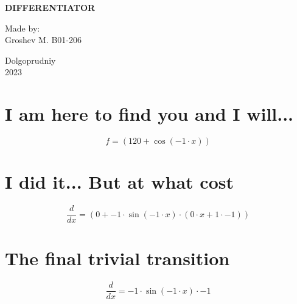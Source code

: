 \documentclass[a4paper, 12pt]{article}
\title{}
\date{}
\begin{document}

    \begin{titlepage}
    \maketitle
    \thispagestyle{empty}

            \begin{center}
                  \Large \textbf{DIFFERENTIATOR}
            \end{center}

             \vspace{20em}
             \begin{flushright}
                 \normalsize Made by: \\
                             Groshev M. B01-206
             \end{flushright}

             \begin{center}
                    \vfill \normalsize Dolgoprudniy \\ 2023
             \end{center}
    \end{titlepage}


\section{I am here to find you and I will...}\begin{equation*}
    f = ({{120}}+{\cos({{{-1}}\cdot{{x}}})})
\end{equation*}

\section{I did it... But at what cost}\begin{equation*}
    \frac{d}{dx} = ({{0}}+{{{{-1}}\cdot{\sin({{{-1}}\cdot{{x}}})}}\cdot{({{{0}}\cdot{{x}}}+{{{1}}\cdot{{-1}}})}})
\end{equation*}

\section{The final trivial transition}\begin{equation*}
    \frac{d}{dx} = {{{-1}}\cdot{\sin({{{-1}}\cdot{{x}}})}}\cdot{{-1}}
\end{equation*}
\end{document}
